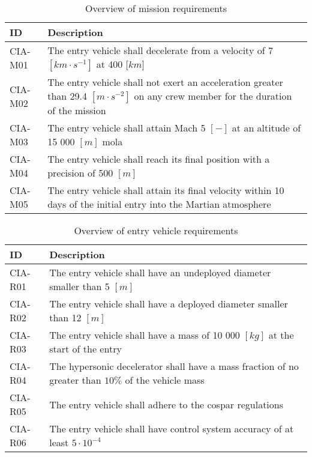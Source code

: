 \begin{table}[h]
	\caption{Overview of mission requirements}
	\label{tab:misreq} 
	\begin{tabular}{|p{}|p{}|}
    \hline
    \textbf{ID}          & \textbf{Description}                                                                                                      \\ \hline \hline
    CIA-M01& The entry vehicle shall decelerate from a velocity of 7 $[km\cdot s ^{-1}]$ at 400 [$km$]  \\ \hline
    CIA-M02 & The entry vehicle shall not exert an acceleration greater than 29.4 $[m \cdot s^{-2}]$ on any crew member for the duration of the mission			\\ \hline
    	CIA-M03 & The entry vehicle shall attain Mach 5 $[-]$ at an altitude of 15 000 $[m]$  \gls{mola} \\ \hline
    	CIA-M04 & The entry vehicle shall reach its final position with a precision of 500 $[m]$\\ \hline
    	CIA-M05 & The entry vehicle shall attain its final velocity within 10 days of the initial entry into the Martian atmosphere \\ \hline
    \end{tabular}
\end{table}

\begin{table}[h]
	\caption{Overview of entry vehicle requirements} 
	\label{tab:vehreq}
	\begin{tabular}{|p{}|p{}|}
	    \hline
	    \textbf{ID}          & \textbf{Description}                                                                                                     \\ \hline \hline
	CIA-R01 & The entry vehicle shall have an undeployed diameter smaller than 5 $[m]$                         				            \\ \hline
	CIA-R02 & The entry vehicle shall have a deployed diameter smaller than 12 $[m]$                         				            \\ \hline	
	CIA-R03 & The entry vehicle shall have a mass of 10 000 $[kg]$ at the start of the entry                       				            \\ \hline
	CIA-R04 & The hypersonic decelerator shall have a mass fraction of no greater than $10\%$ of the vehicle mass  \\ \hline
	CIA-R05 &  The entry vehicle shall adhere to the \gls{cospar} regulations \\ \hline
	CIA-R06 &  The entry vehicle shall have control system accuracy of at least $5\cdot 10^{-4}$  \\ \hline
    \end{tabular}
\end{table}